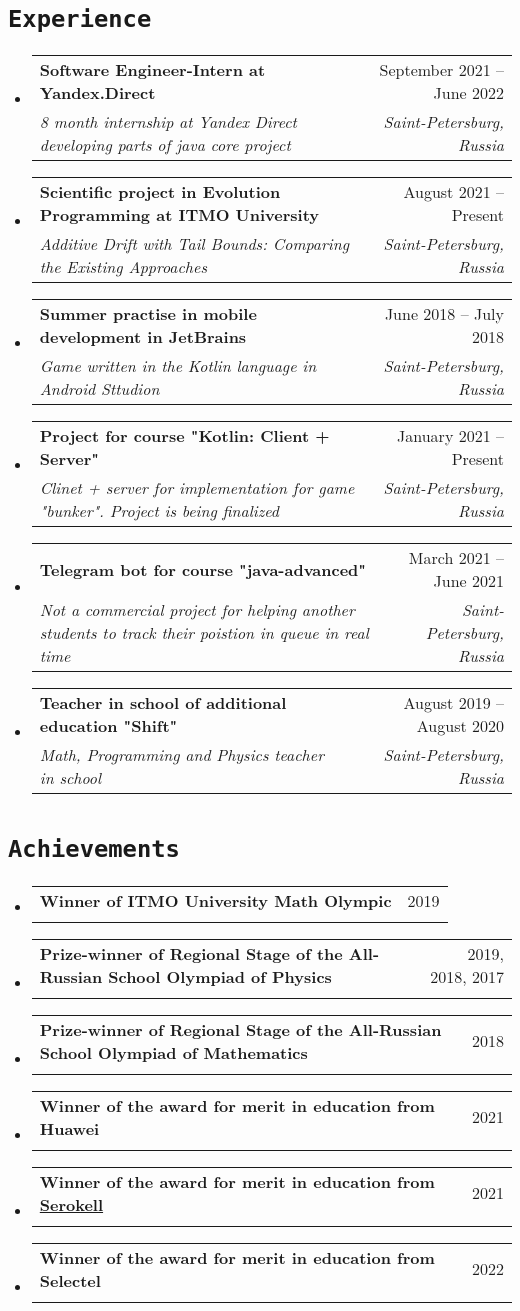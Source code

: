 \documentclass[letterpaper,10pt]{article}
\makeatletter
\newcommand{\apricotColor}[1]{\colorbox{Apricot}{\texttt{#1}}}
\newcommand{\resumeSubheading}[4]{
  \vspace{-2pt}\item
    \begin{tabular*}{0.97\textwidth}[t]{l@{\extracolsep{\fill}}r}
      \textbf{#1} & #2 \\
      \textit{\small#3} & \textit{\small #4} \\
    \end{tabular*}\vspace{-7pt}
}
\newcommand{\resumeSubHeadingListStart}{\begin{itemize}[leftmargin=0.15in, label={}]}
\newcommand{\resumeSubHeadingListEnd}{\end{itemize}}
\makeatother
\begin{document}
\section{\apricotColor{Experience}}
    \resumeSubHeadingListStart
        \resumeSubheading
            {Software Engineer-Intern at Yandex.Direct}{September 2021 -- June 2022}
            {8 month internship at Yandex Direct developing parts of java core project}{Saint-Petersburg, Russia}
  \resumeSubHeadingListEnd
  \resumeSubHeadingListStart
        \resumeSubheading
            {Scientific project in Evolution Programming at ITMO University}{August 2021 -- Present}
            {Additive Drift with Tail Bounds: Comparing the Existing Approaches}{Saint-Petersburg, Russia}
  \resumeSubHeadingListEnd
  \resumeSubHeadingListStart
    \resumeSubheading
      {Summer practise in mobile development in JetBrains}{June 2018 -- July 2018}
      {Game written in the Kotlin language in Android Sttudion}{Saint-Petersburg, Russia}
  \resumeSubHeadingListEnd
  \resumeSubHeadingListStart
    \resumeSubheading
      {Project for course "Kotlin: Client + Server"}{January 2021 -- Present}
      {Clinet + server for implementation for game "bunker". Project is being finalized}{Saint-Petersburg, Russia}
  \resumeSubHeadingListEnd
  \resumeSubHeadingListStart
    \resumeSubheading
      {Telegram bot for course "java-advanced"}{March 2021 -- June 2021}
      {Not a commercial project for helping another students to track their poistion in queue in real time}{Saint-Petersburg, Russia}
  \resumeSubHeadingListEnd
  \resumeSubHeadingListStart
    \resumeSubheading
      {Teacher in school of additional education "Shift"}{August 2019 -- August 2020}
      {Math, Programming and Physics teacher in school}{Saint-Petersburg, Russia}
  \resumeSubHeadingListEnd

  
\section{\apricotColor{Achievements}}
\resumeSubHeadingListStart
  \resumeSubheading
    {Winner of ITMO University Math Olympic}{2019}
    {}{}
    \resumeSubheading
    {Prize-winner of Regional Stage of the All-Russian School Olympiad of Physics}{2019, 2018, 2017}
    {}{}
    \resumeSubheading
    {Prize-winner of Regional Stage of the All-Russian School Olympiad of Mathematics}{2018}
    {}{}
    \resumeSubheading
    {Winner of the award for merit in education from Huawei}{2021}
    {}{}
    \resumeSubheading
    {Winner of the award for merit in education from  \href{serokell.io}{Serokell}}{2021}
    {}{}
    \resumeSubheading
    {Winner of the award for merit in education from Selectel}{2022}
    {}{}
\resumeSubHeadingListEnd
\end{document}
